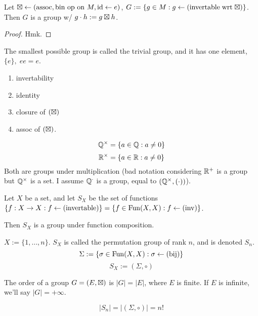 \documentclass[12pt]{article}
\begin{document}
\bbox
\begin{lem}
  Let \(\boxtimes\leftarrow(\text{assoc},\text{bin op on }M,\mathrm{id}\leftarrow e)\),
  \(G:=\{g\in M:g\leftarrow(\mathrm{invertable\;wrt\;\boxtimes})\}\). Then
  \(G\) is a group w/ \(g\cdot h:=g\boxtimes h\).
\end{lem}
\ebox

\bboxproof
\begin{proof}
  Hmk.
\end{proof}
\ebox

The smallest possible group is called the trivial group, and it has one
element, \(\{e\},\;ee=e\).

\begin{enumerate}
  \item invertability
  \item identity
  \item closure of \((\boxtimes)\)
  \item assoc of \((\boxtimes)\).
\end{enumerate}


\bboxex
\[\mathbb Q^\times=\{a\in\mathbb Q:a\neq0\}\]
\[\mathbb R^\times=\{a\in\mathbb R:a\neq0\}\]
Both are groups under multiplication (bad notation considering \(\mathbb R^+\)
is a group but \(\mathbb Q^\times\) is a set. I assume \(\mathbb Q^\cdot\) is a group, equal
to \((\mathbb Q^\times,(\cdot))\)).
\ebox

\bbox
\begin{coro}
  Let \(X\) be a set, and let \(S_X\) be the set of functions
  \(\{f:X\to X:f\leftarrow(\mathrm{invertable})\}=\{f\in\mathrm{Fun}(X,X):f\leftarrow(\mathrm{inv})\}\).

  Then \(S_X\) is a group under function composition.
\end{coro}
\ebox

\bbox
\begin{defn}\label{defn:perm_group}
  \(X:=\{1,\dots,n\}\). \(S_X\) is called the permutation group of rank \(n\),
  and is denoted \(S_n\).
  \bboxnote
  \[\Sigma:=\{\sigma\in\mathrm{Fun}(X,X):\sigma\leftarrow(\mathrm{bij})\}\]
  \[S_X:=(\Sigma,\circ)\]
  \ebox
\end{defn}
\ebox

\bbox
\begin{defn}[Order]\label{defn:order}
  The order of a group \(G=(E,\boxtimes)\) is \(|G|=|E|\), where \(E\) is finite. If
  \(E\) is infinite, we'll say \(|G|=+\infty\).
\end{defn}
\ebox


\bboxex
\[|S_n|=|(\Sigma,\circ)|=n!\]
\ebox

\end{document}
